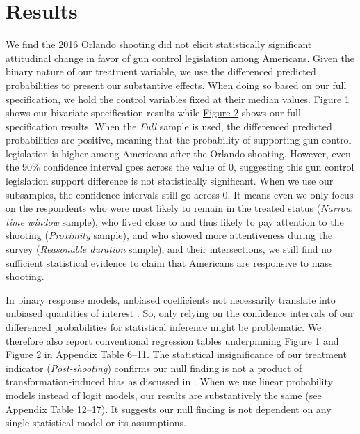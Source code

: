 \documentclass[11pt]{article}
\begin{document}
\section{Results}
We find the 2016 Orlando shooting did not elicit statistically significant attitudinal change in favor of gun control legislation among Americans. Given the binary nature of our treatment variable, we use the differenced predicted probabilities to present our substantive effects. When doing so based on our full specification, we hold the control variables fixed at their median values. \hyperref[fig1]{Figure 1} shows our bivariate specification results while \hyperref[fig2]{Figure 2} shows our full specification results. When the \emph{Full} sample is used, the differenced predicted probabilities are positive, meaning that the probability of supporting gun control legislation is higher among Americans after the Orlando shooting. However, even the 90\% confidence interval goes across the value of 0, suggesting this gun control legislation support difference is not statistically significant. When we use our subsamples, the confidence intervals still go across 0. It means even we only focus on the respondents who were most likely to remain in the treated status (\emph{Narrow time window} sample), who lived close to and thus likely to pay attention to the shooting (\emph{Proximity} sample), and who showed more attentiveness during the survey (\emph{Reasonable duration} sample), and their intersections, we still find no sufficient statistical evidence to claim that Americans are responsive to mass shooting. 

In binary response models, unbiased coefficients not necessarily translate into unbiased quantities of interest \autocite{rainey2017transformation-}. So, only relying on the confidence intervals of our differenced probabilities for statistical inference might be problematic. We therefore also report conventional regression tables underpinning \hyperref[fig1]{Figure 1} and \hyperref[fig2]{Figure 2} in Appendix Table 6--11. The statistical insignificance of our treatment indicator (\emph{Post-shooting}) confirms our null finding is not a product of transformation-induced bias as discussed in \textcite{rainey2017transformation-}. When we use linear probability models instead of logit models, our results are substantively the same (see Appendix Table 12--17). It suggests our null finding is not dependent on any single statistical model or its assumptions. 


\end{document}
